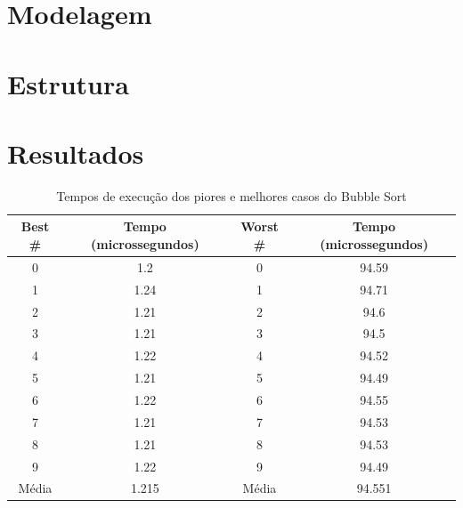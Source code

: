 \documentclass[10pt,a4paper]{article}
\begin{document}
\section{Modelagem}



\section{Estrutura}


\section{Resultados}
\begin{center}
\begin{table}
\begin{tabular}{| c | c | c | c |}
\hline
Best \# & Tempo (microssegundos) & Worst \# & Tempo (microssegundos) \\ \hline 
0 & 1.2 & 0 & 94.59 \\ \hline 
1 & 1.24 & 1 & 94.71 \\ \hline 
2 & 1.21 & 2 & 94.6 \\ \hline 
3 & 1.21 & 3 & 94.5 \\ \hline 
4 & 1.22 & 4 & 94.52 \\ \hline 
5 & 1.21 & 5 & 94.49 \\ \hline 
6 & 1.22 & 6 & 94.55 \\ \hline 
7 & 1.21 & 7 & 94.53 \\ \hline 
8 & 1.21 & 8 & 94.53 \\ \hline 
9 & 1.22 & 9 & 94.49 \\ \hline 
Média & 1.215 & Média & 94.551 \\ \hline 
\end{tabular}
\caption{Tempos de execução dos piores e melhores casos do Bubble Sort}
\label{table:bubble_worst_best}
\end{table}
\end{center}
\end{document}
